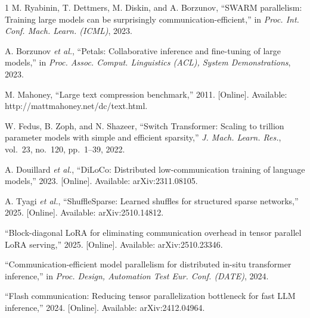 \documentclass[10pt,journal]{IEEEtran}
\begin{document}
\begin{thebibliography}{1}
M. Ryabinin, T. Dettmers, M. Diskin, and A. Borzunov, ``SWARM parallelism: Training large
models can be surprisingly communication-efficient,'' in \emph{Proc. Int. Conf. Mach. Learn.
(ICML)}, 2023.

A. Borzunov \emph{et al.}, ``Petals: Collaborative inference and fine-tuning of large models,''
in \emph{Proc. Assoc. Comput. Linguistics (ACL), System Demonstrations}, 2023.

M. Mahoney, ``Large text compression benchmark,'' 2011. [Online]. Available:
http://mattmahoney.net/dc/text.html.

W. Fedus, B. Zoph, and N. Shazeer, ``Switch Transformer: Scaling to trillion parameter models
with simple and efficient sparsity,'' \emph{J. Mach. Learn. Res.}, vol.~23, no.~120,
pp.~1--39, 2022.

A. Douillard \emph{et al.}, ``DiLoCo: Distributed low-communication training of language
models,'' 2023. [Online]. Available: arXiv:2311.08105.

A. Tyagi \emph{et al.}, ``ShuffleSparse: Learned shuffles for structured sparse networks,''
2025. [Online]. Available: arXiv:2510.14812.

``Block-diagonal LoRA for eliminating communication overhead in tensor parallel LoRA
serving,'' 2025. [Online]. Available: arXiv:2510.23346.

``Communication-efficient model parallelism for distributed in-situ transformer inference,''
in \emph{Proc. Design, Automation Test Eur. Conf. (DATE)}, 2024.

``Flash communication: Reducing tensor parallelization bottleneck for fast LLM inference,''
2024. [Online]. Available: arXiv:2412.04964.
\end{thebibliography}
\end{document}
